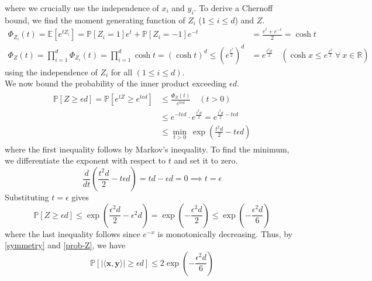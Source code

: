\documentclass[9pt]{article}
\begin{document}
where we crucially use the independence of $x_{i}$ and $y_{i}$. To derive a Chernoff bound, we
find the moment generating function of $Z_{i}$ ($1 \leq i \leq d$) and $Z$.
\begin{align}
    \Phi_{Z_{i}}(t) = \mathbb{E}[e^{tZ_{i}}] = \mathbb{P}[Z_{i} = 1]e^{t} + \mathbb{P}[Z_{i} = -1]e^{-t}
    &= \frac{e^{t} + e^{-t}}{2} = \cosh{t} \\
    \Phi_{Z}(t) = \prod_{i=1}^{d} \Phi_{Z_{i}}(t) = \prod_{i=1}^{d} \cosh{t} = \left( \cosh{t} \right)^{d}
    \leq \left( e^{\frac{t^{2}}{2}} \right)^{d} &= e^{\frac{t^{2}d}{2}} \quad \left(\cosh{x} \leq e^{\frac{x^{2}}{2}} \ \forall \ x \in \mathbb{R} \right)
\end{align}
using the independence of $Z_{i}$ for all $(1 \leq i \leq d)$.
\pagebreak \\
We now bound the probability of the inner product exceeding $\epsilon d$.
\begin{align}
    \begin{split}
        \mathbb{P}[Z \geq \epsilon d] = \mathbb{P}[e^{tZ} \geq e^{t\epsilon d}]
        &\leq \frac{\Phi_{Z}(t)}{e^{t \epsilon d}} \quad (t > 0) \\
        &\leq e^{-t \epsilon d} \cdot e^{\frac{t^{2}d}{2}} = e^{\frac{t^{2}d}{2} - t \epsilon d} \\
        &\leq \min_{t > 0} \ \exp{\left( \frac{t^{2}d}{2} - t \epsilon d \right)}
    \end{split}
\end{align}
where the first inequality follows by Markov's inequality. To find the minimum, we differentiate the
exponent with respect to $t$ and set it to zero.
\begin{equation}
    \frac{d}{dt} \left( \frac{t^{2}d}{2} - t \epsilon d \right) = td - \epsilon d = 0 \implies t = \epsilon
\end{equation}
Substituting $t = \epsilon$ gives
\begin{equation}
    \label{prob-Z}
    \mathbb{P}[Z \geq \epsilon d] \leq \exp{\left( \frac{\epsilon^{2}d}{2} - \epsilon^{2}d \right)}
    = \exp{\left( -\frac{\epsilon^{2}d}{2} \right)}
    \leq \exp{\left( -\frac{\epsilon^{2}d}{6} \right)}
\end{equation}
where the last inequality follows since $e^{-x}$ is monotonically decreasing.
Thus, by \eqref{symmetry} and \eqref{prob-Z}, we have
\begin{equation}
    \label{final-2a}
    \mathbb{P}[ \lvert \langle \mathbf{x}, \mathbf{y} \rangle \rvert \geq \epsilon d] \leq 2 \exp{\left(-\frac{\epsilon^{2}d}{6}\right)}
\end{equation}
\end{document}
